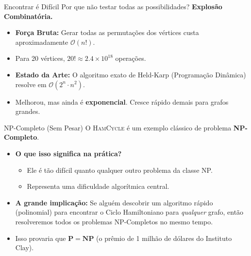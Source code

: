 \documentclass[10pt, aspectratio=169]{beamer}
\begin{document}
\begin{frame}{Encontrar é Difícil}
    Por que não testar todas as possibilidades? \textbf{Explosão Combinatória.}
    
    \vspace{1em}
    \begin{itemize}
        \item \textbf{Força Bruta:} Gerar todas as permutações dos vértices custa aproximadamente $\mathcal{O}(n!)$.
        \item Para 20 vértices, $20! \approx 2.4 \times 10^{18}$ operações.
        \item \textbf{Estado da Arte:} O algoritmo exato de Held-Karp (Programação Dinâmica) resolve em $\mathcal{O}(2^n \cdot n^2)$.
        \item Melhorou, mas ainda é \textbf{exponencial}. Cresce rápido demais para grafos grandes.
    \end{itemize}
\end{frame}

\begin{frame}{NP-Completo (Sem Pesar)}
    O \textsc{HamCycle} é um exemplo clássico de problema \textbf{NP-Completo}.
    
    \vspace{1em}
    \begin{itemize}
        \item \textbf{O que isso significa na prática?}
        \begin{itemize}
            \item Ele é tão difícil quanto qualquer outro problema da classe NP.
            \item Representa uma dificuldade algorítmica central.
        \end{itemize}
        \vspace{1em}
        \item \textbf{A grande implicação:} Se alguém descobrir um algoritmo rápido (polinomial) para encontrar o Ciclo Hamiltoniano para \textit{qualquer} grafo, então resolveremos todos os problemas NP-Completos no mesmo tempo. 
        \item Isso provaria que $\mathbf{P} = \mathbf{NP}$ (o prêmio de 1 milhão de dólares do Instituto Clay).
    \end{itemize}
\end{frame}
\end{document}
